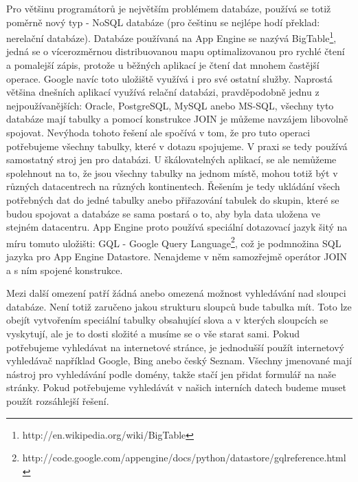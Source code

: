 Pro většinu programátorů je největším problémem databáze, používá se totiž poměrně nový typ - NoSQL databáze (pro češtinu se nejlépe hodí překlad: nerelační databáze). Databáze používaná na App Engine se nazývá BigTable\footnote{http://en.wikipedia.org/wiki/BigTable}, jedná se o vícerozměrnou distribuovanou mapu optimalizovanou pro rychlé čtení a pomalejší zápis, protože u běžných aplikací je čtení dat mnohem častější operace. Google navíc toto uložiště využívá i pro své ostatní služby. Naprostá většina dnešních aplikací využívá relační databázi, pravděpodobně jednu z nejpoužívanějších: Oracle, PostgreSQL, MySQL anebo MS-SQL, všechny tyto databáze mají tabulky a pomocí konstrukce JOIN je můžeme navzájem libovolně spojovat. Nevýhoda tohoto řešení ale spočívá v tom, že pro tuto operaci potřebujeme všechny tabulky, které v dotazu spojujeme. V praxi se tedy používá samostatný stroj jen pro databázi. U škálovatelných aplikací, se ale nemůžeme spolehnout na to, že jsou všechny tabulky na jednom místě, mohou totiž být v různých datacentrech na různých kontinentech. Řešením je tedy ukládání všech potřebných dat do jedné tabulky anebo přiřazování tabulek do skupin, které se budou spojovat a databáze se sama postará o to, aby byla data uložena ve stejném datacentru. App Engine proto používá speciální dotazovací jazyk šitý na míru tomuto uložišti: GQL - Google Query Language\footnote{http://code.google.com/appengine/docs/python/datastore/gqlreference.html},
což je podmnožina SQL jazyka pro App Engine Datastore. Nenajdeme v něm samozřejmě operátor JOIN a s ním spojené konstrukce.

Mezi další omezení patří žádná anebo omezená možnost vyhledávání nad sloupci databáze. Není totiž zaručeno jakou strukturu sloupců bude tabulka mít. Toto lze obejít vytvořením speciální tabulky obsahující slova a v kterých sloupcích se vyskytují, ale je to dosti složité a musíme se o vše starat sami. Pokud potřebujeme vyhledávat na internetové stránce, je jednodušší použít internetový vyhledávač například Google, Bing anebo český Seznam. Všechny jmenované mají nástroj pro vyhledávání podle domény, takže stačí jen přidat formulář na naše stránky. Pokud potřebujeme vyhledávát v našich interních datech budeme muset použít rozsáhlejší řešení.

